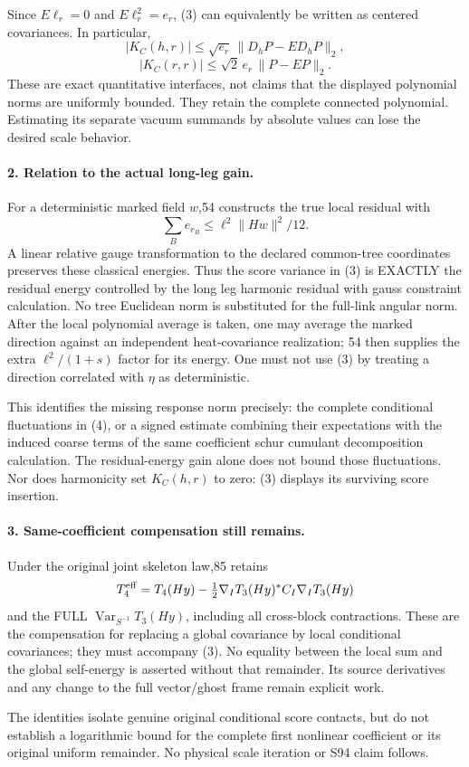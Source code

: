 \documentclass[11pt]{article}
\begin{document}
Since $E\ell_r=0$ and $E\ell_r^2=e_r$, (3) can equivalently be written
as centered covariances. In particular,
\[
 |K_C(h,r)|\le\sqrt{e_r}\,
                \|D_hP-E D_hP\|_2,
\]
\[
 |K_C(r,r)|\le\sqrt2\,e_r\,\|P-EP\|_2.                       \tag{4}
\]
These are exact quantitative interfaces, not claims that the displayed
polynomial norms are uniformly bounded. They retain the complete
connected polynomial. Estimating its separate vacuum summands by
absolute values can lose the desired scale behavior.

\paragraph{2. Relation to the actual long-leg gain.}
For a deterministic marked field $w$,54 constructs the true local
residual with
\[
 \sum_B e_{r_B}\le \ell^2\|Hw\|^2/12.
\]
A linear relative gauge transformation to the declared common-tree
coordinates preserves these classical energies. Thus the score
variance in (3) is EXACTLY the residual energy controlled by the long leg harmonic residual with gauss constraint calculation.
No tree Euclidean norm is substituted for the full-link angular norm.
After the local polynomial average is taken, one may average the
marked direction against an independent heat-covariance realization;
54 then supplies the extra $\ell^2/(1+s)$ factor for its energy.
One must not use (3) by treating a direction correlated with $\eta$
as deterministic.

This identifies the missing response norm precisely: the complete
conditional fluctuations in (4), or a signed estimate combining their
expectations with the induced coarse terms of the same coefficient schur cumulant decomposition calculation. The residual-energy gain
alone does not bound those fluctuations. Nor does harmonicity set
$K_C(h,r)$ to zero: (3) displays its surviving score insertion.

\paragraph{3. Same-coefficient compensation still remains.}
Under the original joint skeleton law,85 retains
\[
 T_4^{\rm eff}=T_4(Hy)
 -\tfrac12\nabla_I T_3(Hy)^*C_I\nabla_I T_3(Hy)
\]
and the FULL $\operatorname{Var}_{S^{-1}}T_3(Hy)$, including all
cross-block contractions. These are the compensation for replacing a
global covariance by local conditional covariances; they must accompany
(3). No equality between the local sum and the global self-energy is
asserted without that remainder. Its source derivatives and any change
to the full vector/ghost frame remain explicit work.

The identities isolate genuine original conditional score contacts,
but do not establish a logarithmic bound for the complete first
nonlinear coefficient or its original uniform remainder. No physical
scale iteration or S94 claim follows.
\end{document}
